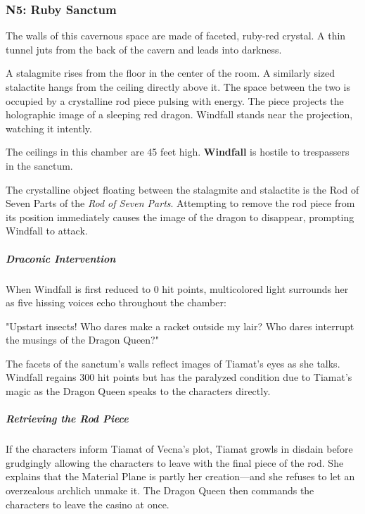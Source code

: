 \documentclass[10pt,a4paper,twoside,bg=print,twocolumn,openany,nodeprecatedcode]{dndbook}
\begin{document}
\subsubsection{N5: Ruby Sanctum}
\begin{DndReadAloud}{}
The walls of this cavernous space are made of faceted, ruby-red crystal. A thin tunnel juts from the back of the cavern and leads into darkness.

A stalagmite rises from the floor in the center of the room. A similarly sized stalactite hangs from the ceiling directly above it. The space between the two is occupied by a crystalline rod piece pulsing with energy. The piece projects the holographic image of a sleeping red dragon. Windfall stands near the projection, watching it intently.

\end{DndReadAloud}

The ceilings in this chamber are 45 feet high. \textbf{Windfall} is hostile to trespassers in the sanctum.

The crystalline object floating between the stalagmite and stalactite is the Rod of Seven Parts of the \textit{Rod of Seven Parts}. Attempting to remove the rod piece from its position immediately causes the image of the dragon to disappear, prompting Windfall to attack.

\subparagraph{Draconic Intervention}
When Windfall is first reduced to 0 hit points, multicolored light surrounds her as five hissing voices echo throughout the chamber:

\begin{DndReadAloud}{}
"Upstart insects! Who dares make a racket outside my lair? Who dares interrupt the musings of the Dragon Queen?"

\end{DndReadAloud}

The facets of the sanctum's walls reflect images of Tiamat's eyes as she talks. Windfall regains 300 hit points but has the paralyzed condition due to Tiamat's magic as the Dragon Queen speaks to the characters directly.

\subparagraph{Retrieving the Rod Piece}
If the characters inform Tiamat of Vecna's plot, Tiamat growls in disdain before grudgingly allowing the characters to leave with the final piece of the rod. She explains that the Material Plane is partly her creation—and she refuses to let an overzealous archlich unmake it. The Dragon Queen then commands the characters to leave the casino at once.
\end{document}
